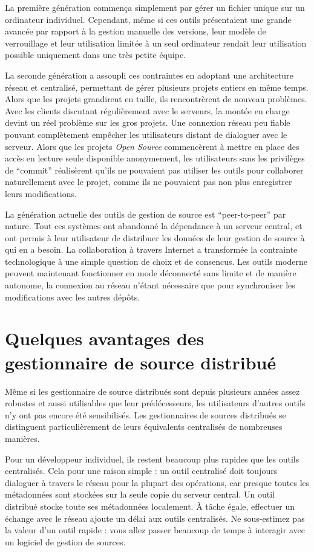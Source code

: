 La première génération commença simplement par gérer un fichier unique sur un
ordinateur individuel. Cependant, même si ces outils présentaient une grande
avancée par rapport à la gestion manuelle des versions, leur modèle de
verrouillage et leur utilisation limitée à un seul ordinateur rendait leur
utilisation possible uniquement dans une très petite équipe. 

La seconde génération a assoupli ces contraintes en adoptant une architecture
réseau et centralisé, permettant de gérer plusieurs projets entiers en même
temps. Alors que les projets grandirent en taille, ils rencontrèrent de nouveau
problèmes. Avec les clients discutant régulièrement avec le serveurs, la montée
en charge devint un réel problème sur les gros projets. Une connexion réseau
peu fiable pouvant complètement empêcher les utilisateurs distant de dialoguer
avec le serveur. Alors que les projets \textit{Open Source} commencèrent à
mettre en place des accès en lecture seule disponible anonymement, les
utilisateurs sans les privilèges de ``commit'' réalisèrent qu'ils ne pouvaient
pas utiliser les outils pour collaborer naturellement avec le projet, comme ils
ne pouvaient pas non plus enregistrer leurs modifications.

La génération actuelle des outils de gestion de source est ``peer-to-peer'' par
nature. Tout ces systèmes ont abandonné la dépendance à un serveur central, et
ont permis à leur utilisateur de distribuer les données de leur gestion de
source à qui en a besoin. La collaboration à travers Internet a transformée la
contrainte technologique à une simple question de choix et de consencus. Les
outils moderne peuvent maintenant fonctionner en mode déconnecté sans limite et
de manière autonome, la connexion au réseau n'étant nécessaire que pour
synchroniser les modifications avec les autres dépôts.

\section{Quelques avantages des gestionnaire de source distribué}

Même si les gestionnaire de source distribués sont depuis plusieurs années
assez robustes et aussi utilisables que leur prédécesseurs, les utilisateurs
d'autres outils n'y ont pas encore été sensibilisés. Les gestionnaires
de sources distribués se distinguent particulièrement de leurs équivalents
centralisés de nombreuses manières.

Pour un développeur individuel, ils restent beaucoup plus rapides que les
outils centralisés. Cela pour une raison simple : un outil centralisé doit
toujours dialoguer à travers le réseau pour la plupart des opérations, car
presque toutes les métadonnées sont stockées sur la seule copie du serveur
central. Un outil distribué stocke toute ses métadonnées localement. À tâche
égale, effectuer un échange avec le réseau ajoute un délai aux outils 
centralisés. Ne sous-estimez pas la valeur d'un outil rapide : vous allez
passer beaucoup de temps à interagir avec un logiciel de gestion de sources.

